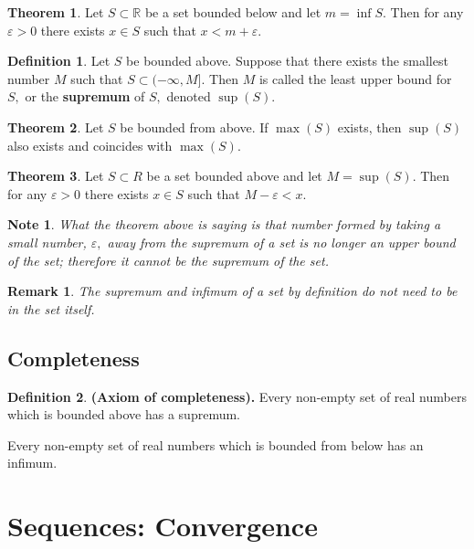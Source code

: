 \documentclass[12pt, a4paper]{article}
\newcommand{\bb}[1]{\mathbb{#1}}
\newtheorem*{remark}{Remark}
\newtheorem*{note}{Note}
\theoremstyle{definition}
\newtheorem{definition}{Definition}[section]
\newtheorem{theorem}{Theorem}[section]
\theoremstyle{plain}
\begin{document}
\begin{theorem}
Let $S\subset \bb{R}$ be a set bounded below and let $m=\inf{S}.$ Then for any $\varepsilon>0$ there exists $x\in S$ such that $x<m+\varepsilon.$
\end{theorem}

\begin{definition}
Let $S$ be bounded above. Suppose that there exists the smallest number $M$ such that $S \subset (-\infty,M]$. Then $M$ is called the least upper bound for $S,$ or the \textbf{supremum} of $S,$ denoted $\sup(S).$
\end{definition}

\begin{theorem}
Let $S$ be bounded from above. If $\max(S)$ exists, then $\sup(S)$ also exists and coincides with $\max(S).$
\end{theorem}

\begin{theorem}
Let $S \subset R$ be a set bounded above and let $M = \sup(S).$ Then for any $\varepsilon > 0$ there exists $x \in S$ such that $M -\varepsilon < x.$
\end{theorem}

\begin{note}
What the theorem above is saying is that number formed by taking a small number, $\varepsilon,$ away from the supremum of a set is no longer an upper bound of the set; therefore it cannot be the supremum of the set.
\end{note}

\begin{remark}
The supremum and infimum of a set by definition do not need to be in the set itself.
\end{remark}

\subsection{Completeness}

\begin{definition} \textbf{(Axiom of completeness).}
Every non-empty set of real numbers which is bounded above has a supremum. 

Every non-empty set of real numbers which is bounded from below has an infimum.
\end{definition}

\section{Sequences: Convergence}
\end{document}
